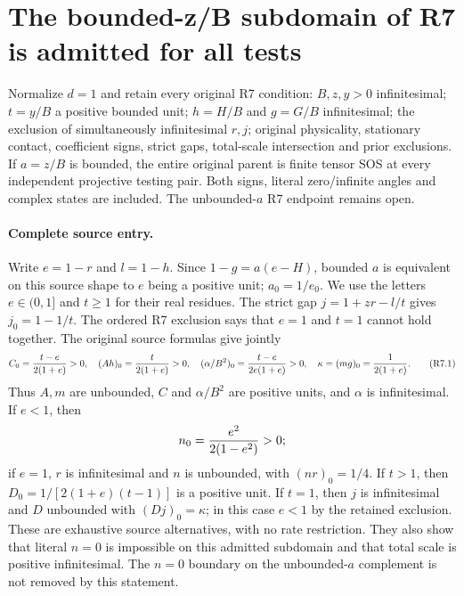 \section{The bounded-z/B subdomain of R7 is admitted for all tests}
\label{sec:r17-r7-bounded-a}
\begin{theorem}
Normalize $d=1$ and retain every original R7 condition: $B,z,y>0$
infinitesimal; $t=y/B$ a positive bounded unit; $h=H/B$ and $g=G/B$
infinitesimal; the exclusion of simultaneously infinitesimal $r,j$;
original physicality, stationary contact, coefficient signs, strict gaps,
total-scale intersection and prior exclusions. If $a=z/B$ is bounded,
the entire original parent is finite tensor SOS at every independent
projective testing pair. Both signs, literal zero/infinite angles and
complex states are included. The unbounded-$a$ R7 endpoint remains open.
\end{theorem}

\paragraph{Complete source entry.}
Write $e=1-r$ and $l=1-h$. Since $1-g=a(e-H)$, bounded $a$ is equivalent
on this source shape to $e$ being a positive unit; $a_0=1/e_0$.
We use the letters $e\in(0,1]$ and $t\ge1$ for their real residues.
The strict gap $j=1+zr-l/t$ gives $j_0=1-1/t$. The ordered R7 exclusion
says that $e=1$ and $t=1$ cannot hold together. The original source formulas
give jointly
\[
 C_0={t-e\over2(1+e)}>0,\quad
 (Ah)_0={t\over2(1+e)}>0,\quad
 (\alpha/B^2)_0={t-e\over2e(1+e)}>0,\quad
 \kappa=(mg)_0={1\over2(1+e)}.                        \tag{R7.1}
\]
Thus $A,m$ are unbounded, $C$ and $\alpha/B^2$ are positive units,
and $\alpha$ is infinitesimal. If $e<1$, then
\[
 n_0={e^2\over2(1-e^2)}>0;
\]
if $e=1$, $r$ is infinitesimal and $n$ is unbounded, with $(nr)_0=1/4$.
If $t>1$, then $D_0=1/[2(1+e)(t-1)]$ is a positive unit. If $t=1$,
then $j$ is infinitesimal and $D$ unbounded with $(Dj)_0=\kappa$;
in this case $e<1$ by the retained exclusion. These are exhaustive
source alternatives, with no rate restriction. They also show that
literal $n=0$ is impossible on this admitted subdomain and that total
scale is positive infinitesimal. The $n=0$ boundary on the unbounded-$a$
complement is not removed by this statement.

